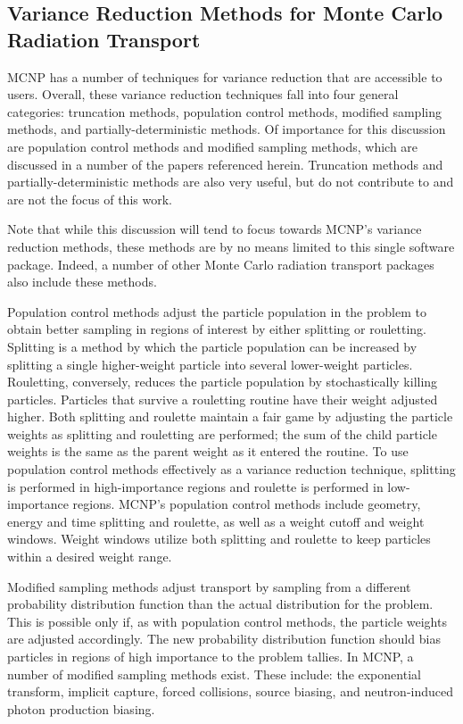 \subsection{Variance Reduction Methods for Monte Carlo Radiation Transport}
\label{subsec:MCVR}
MCNP \cite{hendricks_mcnp_1985, brown_mcnp_2002} has a number of techniques for
variance
reduction that are accessible to users. Overall, these variance reduction
techniques fall
into four general categories: truncation methods, population control methods, modified
sampling methods, and partially-deterministic methods. Of importance for this discussion are
population control methods and modified sampling methods, which are discussed in
a number
of the papers referenced herein. Truncation methods and partially-deterministic
methods are also very useful, but do not contribute to and
are not the focus of this work.

Note that while this
discussion will tend to focus towards MCNP's variance reduction methods, these
methods are by no means limited to this single software package. Indeed, a
number of other Monte Carlo radiation transport packages also include these
methods.

Population control methods adjust the particle population in the problem to
obtain better sampling in regions of interest by either splitting or rouletting.
Splitting is a method by which the particle population can be increased by
splitting a single higher-weight particle into several lower-weight particles.
Rouletting, conversely, reduces the particle population by stochastically
killing particles. Particles that survive a rouletting routine have their weight
adjusted higher.
Both splitting and roulette maintain a
fair game by adjusting the particle weights as splitting and rouletting are
performed; the sum of the child particle weights is the same as the parent
weight as it entered the routine.
To use population control methods effectively as a variance reduction technique,
splitting is performed in high-importance regions and roulette is performed in
 low-importance
  regions. MCNP's population control methods include geometry, energy and time
  splitting
  and roulette, as well as a weight cutoff and weight windows. Weight windows
  utilize both
 splitting and roulette to keep particles within a desired weight range.

Modified sampling methods adjust transport by sampling from a different probability
distribution function than the actual distribution for the problem. This is
possible only
 if, as with population control methods, the particle weights are adjusted
 accordingly.
 The new probability distribution function should bias particles in regions of high
 importance to the problem tallies. In MCNP, a number of modified sampling
 methods exist.
 These include: the exponential transform, implicit capture, forced collisions, source
 biasing, and neutron-induced photon production biasing.

